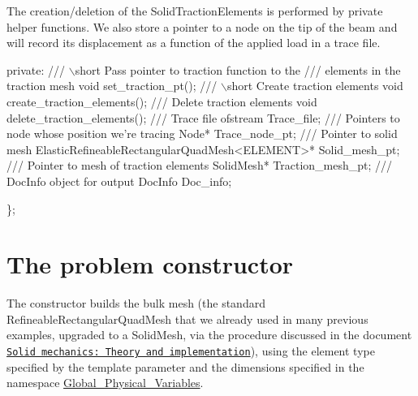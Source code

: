 The creation/deletion of the {\ttfamily Solid\+Traction\+Elements} is performed by private helper functions. We also store a pointer to a node on the tip of the beam and will record its displacement as a function of the applied load in a trace file.


\begin{DoxyCodeInclude}

\textcolor{keyword}{private}:
\textcolor{comment}{}
\textcolor{comment}{ /// \(\backslash\)short Pass pointer to traction function to the}
\textcolor{comment}{ /// elements in the traction mesh}
\textcolor{comment}{} \textcolor{keywordtype}{void} set\_traction\_pt();
\textcolor{comment}{}
\textcolor{comment}{ /// \(\backslash\)short Create traction elements}
\textcolor{comment}{} \textcolor{keywordtype}{void} create\_traction\_elements();
\textcolor{comment}{}
\textcolor{comment}{ /// Delete traction elements}
\textcolor{comment}{} \textcolor{keywordtype}{void} delete\_traction\_elements();
\textcolor{comment}{}
\textcolor{comment}{ /// Trace file}
\textcolor{comment}{} ofstream Trace\_file;
 \textcolor{comment}{}
\textcolor{comment}{ /// Pointers to node whose position we're tracing}
\textcolor{comment}{} Node* Trace\_node\_pt;
\textcolor{comment}{}
\textcolor{comment}{ /// Pointer to solid mesh}
\textcolor{comment}{} ElasticRefineableRectangularQuadMesh<ELEMENT>* Solid\_mesh\_pt;
\textcolor{comment}{}
\textcolor{comment}{ /// Pointer to mesh of traction elements}
\textcolor{comment}{} SolidMesh* Traction\_mesh\_pt;
\textcolor{comment}{}
\textcolor{comment}{ /// DocInfo object for output}
\textcolor{comment}{} DocInfo Doc\_info;
 
\};

\end{DoxyCodeInclude}




 

\hypertarget{index_constructor}{}\section{The problem constructor}\label{index_constructor}
The constructor builds the bulk mesh (the standard {\ttfamily Refineable\+Rectangular\+Quad\+Mesh} that we already used in many previous examples, upgraded to a {\ttfamily Solid\+Mesh}, via the procedure discussed in the document \href{../../solid_theory/html/index.html#solid_mesh}{\tt Solid mechanics\+: Theory and implementation}), using the element type specified by the template parameter and the dimensions specified in the namespace {\ttfamily \hyperlink{namespaceGlobal__Physical__Variables}{Global\+\_\+\+Physical\+\_\+\+Variables}}.

